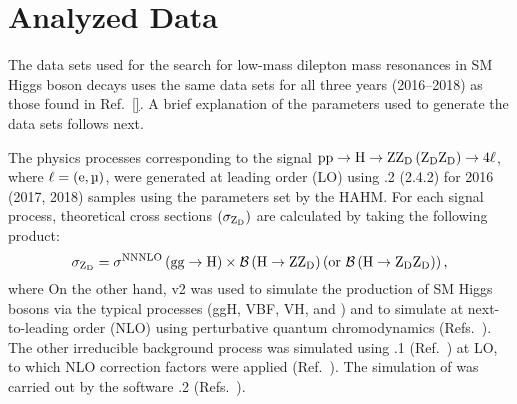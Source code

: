 \section{Analyzed Data}
\label{sec:analyzed_data_dilep}
The data sets used for the search for low-mass dilepton mass resonances in SM Higgs boson decays uses the same data sets for all three years (2016--2018) as those found in Ref.~\ref{}.
A brief explanation of the parameters used to generate the data sets follows next.

The physics processes corresponding to the signal $\mathrm{p} \mathrm{p} \to \mathrm{H} \to \text{Z} \mathrm{Z}_\text{D} \left( \mathrm{Z}_\text{D} \mathrm{Z}_\text{D} \right) \to 4\ell$, where $\ell = (\Pe, \Pmu)$, were generated at leading order (LO) using .2 (2.4.2) for 2016 (2017, 2018) samples using the parameters set by the HAHM.
For each signal process, theoretical cross sections $\left( \sigma_{\mathrm{Z}_\text{D}} \right)$ are calculated by taking the following product:
\begin{equation*}
    \sigma_{\mathrm{Z}_\text{D}} = \sigma^\text{NNNLO}\left( \mathrm{g}\mathrm{g} \to \mathrm{H} \right) \times \mathcal{B} \left( \mathrm{H} \to \text{Z} \mathrm{Z}_\text{D} \right) \left(\text{or } \mathcal{B} \left( \mathrm{H} \to \mathrm{Z}_\text{D} \mathrm{Z}_\text{D} \right) \right),
\end{equation*}
where 
On the other hand, \POWHEG v2 was used to simulate the production of SM Higgs bosons via the typical processes (ggH, VBF, VH, and \ttbarh) and to simulate \qqzz at next-to-leading order (NLO) using perturbative quantum chromodynamics (Refs.~\cite{frixione_matching_2007, bagnaschi_higgs_2012, alioli_general_2010,nason_new_2004}).
The other irreducible background process \ggzz was simulated using .1 (Ref.~\cite{mcfm_campbell_precision_2019}) at LO, to which NLO correction factors were applied (Ref.~\cite{nlo_corr_grazzini_fully_2018}).
The simulation of \htofourl was carried out by the software .2 (Refs.~\cite{hdecay_gao_spin_2010, hdecay_bolognesi_spin_2012}).


